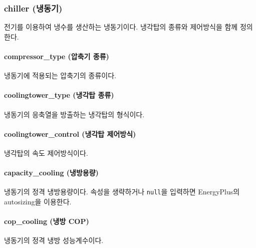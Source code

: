 \subsubsection{chiller (냉동기)} \label{subsubsection:ioref:chiller}

전기를 이용하여 냉수를 생산하는 냉동기이다.
냉각탑의 종류와 제어방식을 함께 정의한다.


\paragraph{compressor\_type (압축기 종류)} 냉동기에 적용되는 압축기의 종류이다.

\paragraph{coolingtower\_type (냉각탑 종류)} 냉동기의 응축열을 방출하는 냉각탑의 형식이다.

\paragraph{coolingtower\_control (냉각탑 제어방식)} 냉각탑의 속도 제어방식이다.

\paragraph{capacity\_cooling (냉방용량)} 냉동기의 정격 냉방용량이다. 속성을 생략하거나 \texttt{null}을 입력하면 EnergyPlus의 autosizing을 이용한다.

\paragraph{cop\_cooling (냉방 COP)} 냉동기의 정격 냉방 성능계수이다. 

